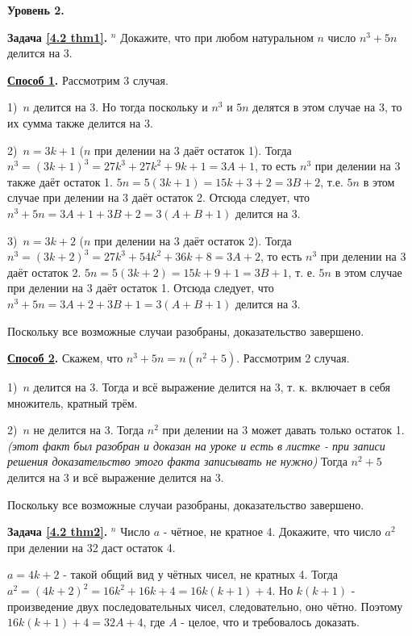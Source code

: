 \begin{center}
\textbf{Уровень 2.}
\end{center}

\textbf{Задача \ref{4.2 thm1}.} $^n$
    Докажите, что при любом натуральном $n$ число $n^3 + 5n$ делится на 3.
\begin{prf}
    \par
    \textbf{\underline{Способ 1}.}
        Рассмотрим 3 случая. 
    \par
        1)~$n$ делится на 3. Но тогда поскольку и $n^3$ и $5n$ делятся в этом случае на 3, то их сумма также делится на 3. 
    \par
        2)~$n = 3k + 1$ ($n$ при делении на 3 даёт остаток 1). Тогда $n^3 = (3k +1)^3 = 27k^3 + 27k^2 + 9k + 1 = 3A + 1$, то есть $n^3$ при делении на 3 также даёт остаток 1. $5n = 5(3k + 1) = 15k + 3 + 2 = 3B + 2$, т.е. $5n$ в этом случае при делении на 3 даёт остаток 2. Отсюда следует, что $n^3 + 5n = 3A + 1 + 3B + 2 = 3(A + B + 1)$ делится на 3. 
    \par
        3)~$n = 3k + 2$ ($n$ при делении на 3 даёт остаток 2). Тогда $n^3 = (3k +2)^3 = 27k^3 + 54k^2 + 36k + 8 = 3A + 2$, то есть $n^3$ при делении на 3 даёт остаток 2. $5n = 5(3k + 2) = 15k + 9 + 1 = 3B + 1$, т. е. $5n$ в этом случае при делении на 3 даёт остаток 1. Отсюда следует, что $n^3 + 5n = 3A + 2 + 3B + 1 = 3(A + B + 1)$ делится на 3. 
    \par
        Поскольку все возможные случаи разобраны, доказательство завершено. 
    \par
    \textbf{\underline{Способ 2}.}
        Скажем, что $n^3 + 5n = n(n^2 + 5)$. Рассмотрим 2 случая.
    \par
        1)~$n$ делится на 3. Тогда и всё выражение делится на 3, т. к. включает в себя множитель, кратный трём.
    \par
        2)~$n$ не делится на 3. Тогда $n^2$ при делении на 3 может давать только остаток 1. \textit{(этот факт был разобран и доказан на уроке и есть в листке - при записи решения доказательство этого факта записывать не нужно)} Тогда $n^2+5$ делится на 3 и всё выражение делится на 3.
    \par
        Поскольку все возможные случаи разобраны, доказательство завершено. 
    \par
\end{prf}

\newpage

\textbf{Задача \ref{4.2 thm2}.} $^n$
    Число $a$ - чётное, не кратное 4. Докажите, что число $a^2$ при делении на 32 даст остаток 4.
\begin{prf}
    $a = 4k + 2$ - такой общий вид у чётных чисел, не кратных 4. Тогда $a^2 = (4k + 2)^2 = 16k^2 + 16k + 4 = 16k(k+1) + 4$. Но $k(k+1)$ - произведение двух последовательных чисел, следовательно, оно чётно. Поэтому $16k(k+1) + 4 = 32A + 4$, где $A$ - целое, что и требовалось доказать.
\end{prf}

